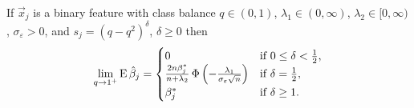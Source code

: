 \begin{theorem}
  \label{thm:classbalance-bias}
  If \(\vec{x}_j\) is a binary feature with class balance \(q \in (0, 1)\), \(\lambda_1 \in (0,\infty)\), \(\lambda_2 \in [0,\infty)\), \(\sigma_\varepsilon > 0\), and \(s_j = (q - q^2)^{\delta}\), \(\delta \geq 0\)  then
  \[
    \lim_{q \rightarrow 1^+} \operatorname{E} \hat{\beta}_j =
    \begin{cases}
      0                                                                           & \text{if } 0 \leq \delta < \frac{1}{2}, \\
      \frac{2n \beta_j^*}{n + \lambda_2} \operatorname{\Phi}\left(-\frac{\lambda_1}{\sigma_\varepsilon \sqrt{n}}\right) & \text{if } \delta = \frac{1}{2},        \\
      \beta^*_j                                                                   & \text{if } \delta \geq 1.
    \end{cases}
  \]
\end{theorem}
